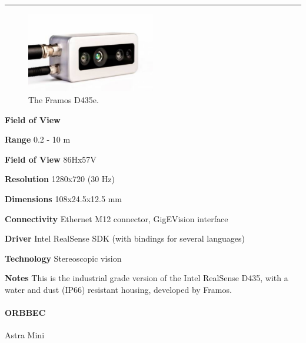 \documentclass[../main.tex]{subfiles}
\begin{document}
\noindent\rule{8cm}{0.1pt}
\begin{figure}[H]
    \centering
    \includegraphics[width=0.5\textwidth]{images/framos.png}
    \caption{The Framos D435e.}
    \label{fig:framos}
\end{figure}
\begin{labeling}{\textbf{Field of View    }}
    \setlength{\itemindent}{2em}
    \item [\textbf{Range}] 0.2 - 10 m
    \item [\textbf{Field of View}] 86Hx57V
    \item [\textbf{Resolution}] 1280x720 (30 Hz)
    \item [\textbf{Dimensions}] 108x24.5x12.5 mm
    \item [\textbf{Connectivity}] Ethernet M12 connector, GigEVision interface
    \item [\textbf{Driver}] Intel RealSense SDK (with bindings for several languages)
    \item [\textbf{Technology}] Stereoscopic vision
    \item [\textbf{Notes}] This is the industrial grade version of the Intel RealSense D435, with a water and dust (IP66) resistant housing, developed by Framos.
\end{labeling}
\vspace{1em}
\paragraph{\large \textbf{ORBBEC}} {\large Astra Mini}
\end{document}
